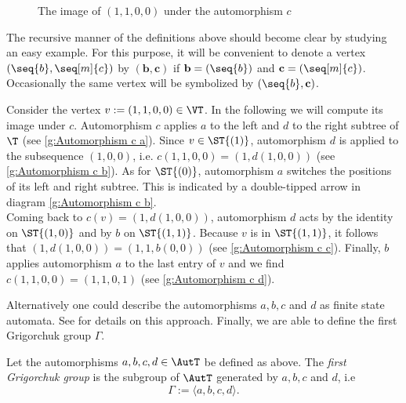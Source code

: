 \begin{centering}
\begin{figure}
{
\endpgfgraphicnamed
}
\caption{The image of $(1,1,0,0)$ under the automorphism $c$}
\label{g:Automorphism c}
\end{figure}
\end{centering}

The recursive manner of the definitions above should become clear by studying an easy example. For this purpose, it will be convenient to denote a vertex $(\seq{b},\seq[m]{c})$ by $(\mathbf{b},\mathbf{c})$ if $\mathbf{b}=(\seq{b})$ and $\mathbf{c}=(\seq[m]{c})$. Occasionally the same vertex will be symbolized by $(\seq{b},\mathbf{c})$.
\begin{exam}
Consider the vertex $v:=(1,1,0,0)\in\VT$. In the following we will compute its image under $c$. Automorphism $c$ applies $a$ to the left and $d$ to the right subtree of $\T$ (see \cref{g:Automorphism c a}). Since $v\in\ST{(1)}$, automorphism $d$ is applied to the subsequence $(1,0,0)$, i.e. $c(1,1,0,0)=(1,d(1,0,0))$ (see \cref{g:Automorphism c b}). As for $\ST{(0)}$, automorphism $a$ switches the positions of its left and right subtree. This is indicated by a double-tipped arrow in diagram \ref{g:Automorphism c b}.\\
Coming back to $c(v)=(1,d(1,0,0))$, automorphism $d$ acts by the identity on $\ST{(1,0)}$ and by $b$ on $\ST{(1,1)}$. Because $v$ is in $\ST{(1,1)}$, it follows that $(1,d(1,0,0))=(1,1,b(0,0))$ (see \cref{g:Automorphism c c}). Finally, $b$ applies automorphism $a$ to the last entry of $v$ and we find $c(1,1,0,0)=(1,1,0,1)$ (see \cref{g:Automorphism c d}).
\end{exam}

Alternatively one could describe the automorphisms $a,b,c$ and $d$ as finite state automata. See \cite{de2000topics} for details on this approach. Finally, we are able to define the first Grigorchuk group $\Gamma$.
\begin{defin}
Let the automorphisms $a,b,c,d\in\AutT$ be defined as above. The \emph{first Grigorchuk group} is the subgroup of $\AutT$ generated by $a,b,c$ and $d$, i.e
\begin{equation*}
\Gamma:=\langle a,b,c,d\rangle.
\end{equation*}
\end{defin}

